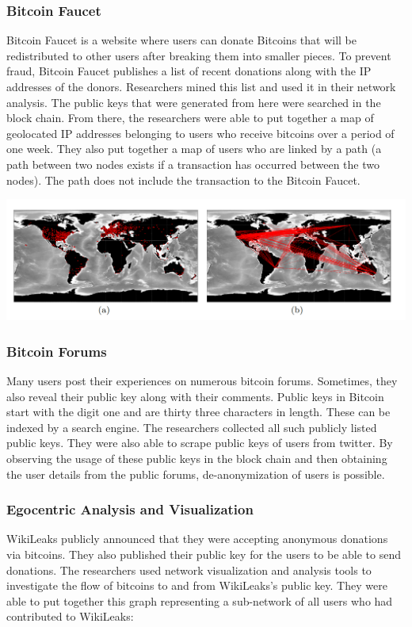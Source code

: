 \subsubsection{Bitcoin Faucet}
Bitcoin Faucet is a website where users can donate Bitcoins that will be redistributed to other users after breaking them into smaller pieces. To prevent fraud, Bitcoin Faucet publishes a list of recent donations along with the IP addresses of the donors. Researchers mined this list and used it in their network analysis. The public keys that were generated from here were searched in the block chain. From there, the researchers were able to put together a map of geolocated IP addresses belonging to users who receive bitcoins over a period of one week. They also put together a map of users who are linked by a path (a path between two nodes exists if a transaction has occurred between the two nodes). The path does not include the transaction to the Bitcoin Faucet. 

\begin{center}
\includegraphics[scale=0.5]{images/map.png}
\end{center}

\subsubsection{Bitcoin Forums}
Many users post their experiences on numerous bitcoin forums. Sometimes, they also reveal their public key along with their comments. Public keys in Bitcoin start with the digit one and are thirty three characters in length. These can be indexed by a search engine. The researchers collected all such publicly listed public keys. They were also able to scrape public keys of users from twitter. By observing the usage of these public keys in the block chain and then obtaining the user details from the public forums, de-anonymization of users is possible.

\subsubsection{Egocentric Analysis and Visualization}
WikiLeaks publicly announced that they were accepting anonymous donations via bitcoins. They also published their public key for the users to be able to send donations. The researchers used network visualization and analysis tools to investigate the flow of bitcoins to and from WikiLeaks's public key. They were able to put together this graph representing a sub-network of all users who had contributed to WikiLeaks:

